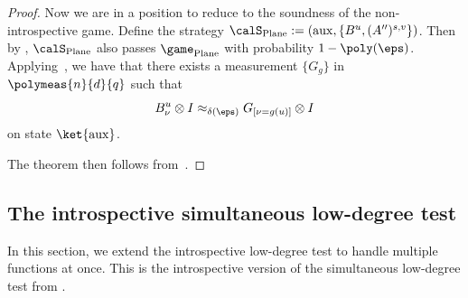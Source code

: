 \begin{proof}
Now we are in a position to reduce to the soundness of the non-introspective game. Define the strategy $\calS_{\mathrm{Plane}} := (\mathrm{aux}, \{B^u, (A'')^{s, v}\})$.
Then by , $\calS_{\mathrm{Plane}}$ also passes $\game_{\mathrm{Plane}}$ with probability $1-\poly(\eps)$.
Applying~, we have that
there exists a measurement $\{G_g\}$ in $\polymeas{n}{d}{q}$ such that
\begin{equation*}
B^u_{\nu}\otimes I \approx_{\delta(\eps)} G_{[\nu = g(u)]}\otimes I
\end{equation*}
on state $\ket{\mathrm{aux}}$.

The theorem then follows from~.
\end{proof}

\subsection{The introspective simultaneous low-degree test}

In this section, we extend the introspective low-degree test to handle multiple functions at once.
This is the  introspective version of the simultaneous low-degree test from .

